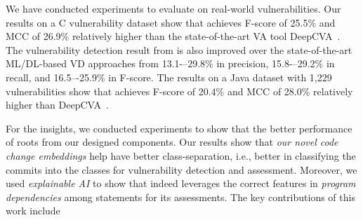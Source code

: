 

We have conducted experiments to evaluate {\tool} on real-world
vulnerabilities. Our results on a C vulnerability dataset
show that {\tool} achieves F-score of 25.5\% and MCC of 26.9\%
relatively higher than the state-of-the-art VA tool
DeepCVA~\cite{deepCVA-ase21}.  The vulnerability detection result from
{\tool} is also improved over the state-of-the-art ML/DL-based VD
approaches from 13.1-–29.8\% in precision, 15.8-–29.2\% in recall,
and 16.5–-25.9\% in F-score. The results on a Java dataset with 1,229
vulnerabilities show that {\tool} achieves F-score of 20.4\% and MCC
of 28.0\% relatively higher than DeepCVA~\cite{deepCVA-ase21}.


For the insights, we conducted experiments to show that the better
performance of {\tool} roots from our designed components.
Our results show that {\em our novel code change embeddings} help
{\tool} have better class-separation, i.e., better in classifying the
commits into the classes for vulnerability detection and
assessment. Moreover, we used {\em explainable AI} to show
that {\tool} indeed leverages the correct features in {\em program
  dependencies} among statements for its assessments.
The key contributions of this work include

